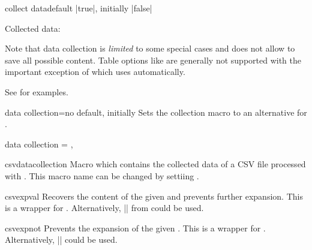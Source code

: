 \documentclass[a4paper,11pt]{ltxdoc}
\begin{document}
\begin{docCsvKey}[][doc new=2021-07-06]{collect data}{}{default |true|, initially |false|}
\begin{dispExample}
Collected data:\par
\csvdatacollection
\end{dispExample}

Note that data collection is \emph{limited} to some special cases and does not
allow to save all possible content. Table options like 
are generally not supported with the important exception of 
which uses  automatically.\par
See  for examples.
\end{docCsvKey}

\clearpage

\begin{docCsvKey}[][doc new=2021-07-06]{data collection}{=}{no default, initially }
Sets the collection macro to an alternative for .
\begin{dispListing}
  data collection = \myData,    %
\end{dispListing}
\end{docCsvKey}


\begin{docCommand}[doc new=2021-07-06]{csvdatacollection}{}
  Macro which contains the collected data of a CSV file processed with
  . This macro name can be changed by
  settiing .
\end{docCommand}


\begin{docCommand}[doc new=2021-07-06]{csvexpval}{}
  Recovers the content of the given  and prevents further
  expansion. This is a wrapper for .
  Alternatively, |\expandonce| from  could be used.
\end{docCommand}


\begin{docCommand}[doc new=2021-07-06]{csvexpnot}{}
  Prevents the expansion of the given . This is a wrapper
  for .
  Alternatively, |\noexpand| could be used.
\end{docCommand}
\end{document}
